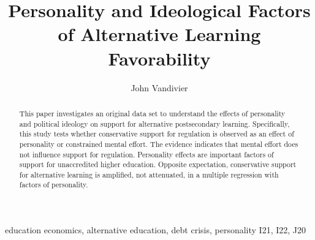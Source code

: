 \documentclass[review]{elsarticle}
\begin{document}
\begin{frontmatter}

    \title{
        Personality and Ideological Factors of Alternative Learning Favorability
    }

    \author[mymainaddress]{John Vandivier} %
    \address[mymainaddress]{4400 University Dr, Fairfax, VA 22030}

    \begin{abstract}
        This paper investigates an original data set to understand
        the effects of personality and political ideology
        on support for alternative postsecondary learning.
        Specifically, this study tests whether conservative support for regulation
        is observed as an effect of personality or constrained mental effort.
        The evidence indicates that mental effort does not influence support for regulation.
        Personality effects are important factors of support for unaccredited higher education.
        Opposite expectation,
        conservative support for alternative learning is amplified,
        not attenuated,
        in a multiple regression with factors of personality.
    \end{abstract}

    \begin{keyword}
        education economics, alternative education, debt crisis, personality    %
        \MSC[2010] I21, I22, J20 %
    \end{keyword}

\end{frontmatter}
\end{document}
